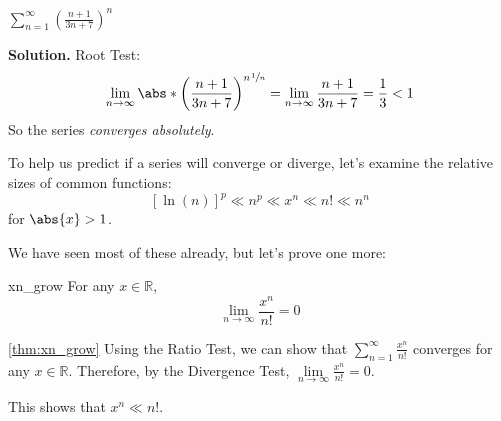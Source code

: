 \begin{Example}{}{}
    $ \displaystyle \sum\limits_{n=1}^{\infty}\left( \frac{n+1}{3n+7} \right)^n $

    \textbf{Solution.} Root Test:
    \[ \lim\limits_{{n} \to {\infty}} \abs*{\left( \frac{n+1}{3n+7} \right)^n}^{\sfrac{1}{n}}
        =\lim\limits_{{n} \to {\infty}} \frac{n+1}{3n+7}
        =\frac{1}{3}
        <1 \]
    So the series \emph{converges absolutely}.
\end{Example}

To help us predict if a series will converge or diverge, let's examine the
relative sizes of common functions:
\[ \boxed{\left[ \ln(n) \right]^p\ll n^p\ll x^n\ll n!\ll n^n} \]
for $ \abs{x}>1 $.

We have seen most of these already, but let's prove one more:
\begin{Theorem}{}{xn_grow}
    For any $ x\in\mathbb{R} $,
    \[ \lim\limits_{{n} \to {\infty}} \frac{x^n}{n!} =0 \]
\end{Theorem}

\begin{Proof}{\ref{thm:xn_grow}}{}
    Using the Ratio Test, we can show that $ \displaystyle\sum\limits_{n=1}^{\infty} \frac{x^n}{n!} $
    converges for any $ x\in\mathbb{R} $. Therefore, by the Divergence Test,
    $ \displaystyle \lim\limits_{{n} \to {\infty}} \frac{x^n}{n!} =0 $.
\end{Proof}
This shows that $ x^n\ll n! $.

